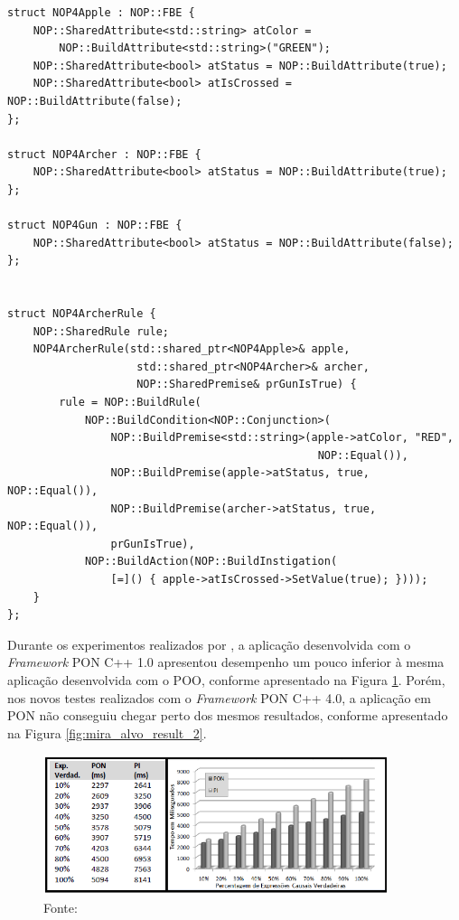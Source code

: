 \begin{lstlisting}[caption = {Código da estrutura do mira ao alvo com o \textit{Framework} PON C++ 4.0},
source = {Autoria própria},
label = {cod:mira_alvo}]
struct NOP4Apple : NOP::FBE {
    NOP::SharedAttribute<std::string> atColor =
        NOP::BuildAttribute<std::string>("GREEN");
    NOP::SharedAttribute<bool> atStatus = NOP::BuildAttribute(true);
    NOP::SharedAttribute<bool> atIsCrossed = NOP::BuildAttribute(false);
};

struct NOP4Archer : NOP::FBE {
    NOP::SharedAttribute<bool> atStatus = NOP::BuildAttribute(true);
};

struct NOP4Gun : NOP::FBE {
    NOP::SharedAttribute<bool> atStatus = NOP::BuildAttribute(false);
};


struct NOP4ArcherRule {
    NOP::SharedRule rule;    
    NOP4ArcherRule(std::shared_ptr<NOP4Apple>& apple,
                    std::shared_ptr<NOP4Archer>& archer,
                    NOP::SharedPremise& prGunIsTrue) {
        rule = NOP::BuildRule(
            NOP::BuildCondition<NOP::Conjunction>(
                NOP::BuildPremise<std::string>(apple->atColor, "RED",
                                                NOP::Equal()),
                NOP::BuildPremise(apple->atStatus, true, NOP::Equal()),
                NOP::BuildPremise(archer->atStatus, true, NOP::Equal()),
                prGunIsTrue),
            NOP::BuildAction(NOP::BuildInstigation(
                [=]() { apple->atIsCrossed->SetValue(true); })));
    }
};
\end{lstlisting}

Durante os experimentos realizados por , a
aplicação desenvolvida com o \textit{Framework} PON C++ 1.0 apresentou
desempenho um pouco inferior à mesma aplicação desenvolvida com o POO, conforme
apresentado na Figura \ref{fig:mira_alvo_result}. Porém, nos novos testes
realizados com o \textit{Framework} PON C++ 4.0, a aplicação em PON não
conseguiu chegar perto dos mesmos resultados, conforme apresentado na Figura
\ref{fig:mira_alvo_result_2}.

\begin{figure}[!htb]
\centering
\caption{Resultado do experimento mira ao alvo com o \textit{Framework PON C++ 1.0}}
\includegraphics[width=0.9\textwidth]{../figures/mira_alvo_result.PNG}
\smallskip
\caption*{Fonte: }
\label{fig:mira_alvo_result}
\end{figure}


